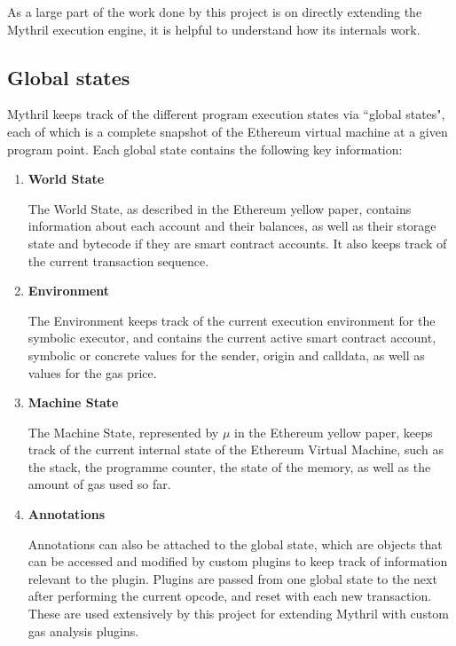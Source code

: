 As a large part of the work done by this project is on directly extending the Mythril execution engine,
it is helpful to understand how its internals work.


\subsection{Global states}

Mythril keeps track of the different program execution states via ``global states", each of which is a complete
snapshot of the Ethereum virtual machine at a given program point. Each global state contains the following key
information:

\begin{enumerate}
    \item \textbf{World State}
    
    The World State, as described in the Ethereum yellow paper, contains information about each account
    and their balances, as well as their storage state and bytecode if they are smart contract accounts.
    It also keeps track of the current transaction sequence.

    \item \textbf{Environment}
    
    The Environment keeps track of the current execution environment for the symbolic executor,
    and contains the current active smart contract account, symbolic or concrete values for the sender, origin
    and calldata, as well as values for the gas price.

    \item \textbf{Machine State}
    
    The Machine State, represented by $\mu$ in the Ethereum yellow paper, keeps track of the current
    internal state of the Ethereum Virtual Machine, such as the stack, the programme counter, the state 
    of the memory, as well as the amount of gas used so far.

    \item \textbf{Annotations}
    
    Annotations can also be attached to the global state, which are objects that can be accessed and modified
    by custom plugins to keep track of information relevant to the plugin. Plugins are passed from one global state
    to the next after performing the current opcode, and reset with each new transaction.
    These are used extensively by this project for extending Mythril with custom gas analysis plugins.
\end{enumerate}

